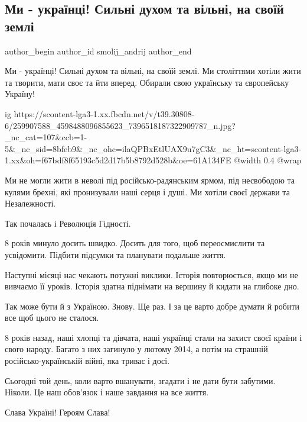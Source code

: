  
 
 
 
 
 
\subsection{Ми - українці! Сильні духом та вільні, на своїй землі}
\label{sec:21_11_2021.fb.smolij_andrij.1.my_ukrainci}
 
\ifcmt
 author_begin
   author_id smolij_andrij
 author_end
\fi

Ми - українці! Сильні духом та вільні, на своїй землі. Ми століттями хотіли
жити та творити, мати своє та йти вперед. Обирали свою українську та
європейську Україну! 

\ifcmt
  ig https://scontent-lga3-1.xx.fbcdn.net/v/t39.30808-6/259907588_4598488096855623_7396518187322909787_n.jpg?_nc_cat=107&ccb=1-5&_nc_sid=8bfeb9&_nc_ohc=ilaQPBxEtlUAX9u7gC3&_nc_ht=scontent-lga3-1.xx&oh=f67bdf8f65193c5d2d17b5b8792d528b&oe=61A134FE
  @width 0.4
  @wrap 
\fi

Ми не могли жити в неволі під російсько-радянським ярмом, під несвободою та
кулями брехні, які пронизували наші серця і душі. Ми хотіли своєї держави та
Незалежності.

Так почалась і Революція Гідності.

8 років минуло досить швидко. Досить для того, щоб переосмислити та усвідомити.
Підбити підсумки та планувати подальше життя. 

Наступні місяці нас чекають потужні виклики. Історія повторюється, якщо ми не
вивчаємо її уроків. Історія здатна піднімати на вершину й кидати на глибоке
дно. 

Так може бути й з Україною. Знову. Ще раз. І за це варто добре думати й робити
все щоб цього не сталося. 

8 років назад, наші хлопці та дівчата, наші українці стали на захист своєї
країни і свого народу. Багато з них загинуло у лютому 2014, а потім на страшній
російсько-українській війні, яка триває і досі.

Сьогодні той день, коли варто вшанувати, згадати і не дати бути забутими.
Ніколи. Це наш обов'язок і наше завдання на все життя. 

Слава Україні! Героям Слава!

